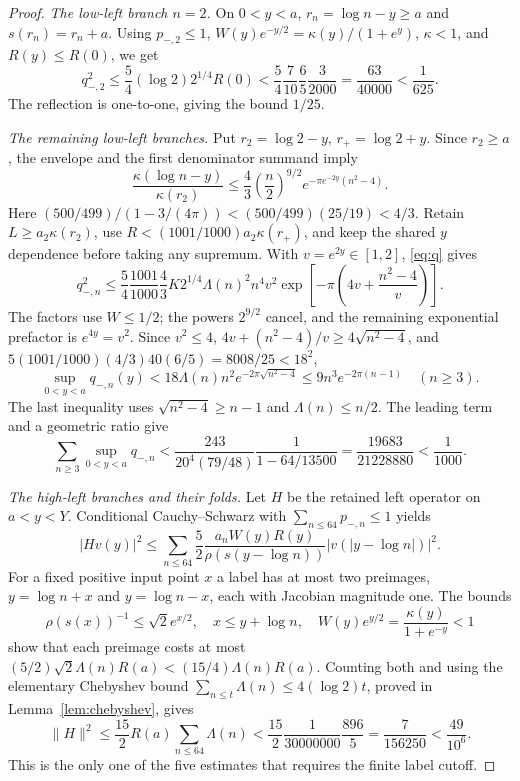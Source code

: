 \documentclass[11pt]{article}
\theoremstyle{remark}\newtheorem{remark}[theorem]{Remark}
\newcommand{\norm}[1]{\lVert #1\rVert}
\numberwithin{equation}{section}
\begin{document}
\begin{proof}
\medskip\noindent
\textit{The low-left branch $n=2$.}
On $0<y<a$, $r_n=\log n-y\ge a$ and $s(r_n)=r_n+a$.
Using $p_{-,2}\le1$, $W(y)e^{-y/2}=\kappa(y)/(1+e^y)$,
$\kappa<1$, and $R(y)\le R(0)$, we get
\[
 q_{-,2}^2\le\frac54(\log2)2^{1/4}R(0)
 <\frac54\frac7{10}\frac65\frac3{2000}
 =\frac{63}{40000}<\frac1{625}.
\]
The reflection is one-to-one, giving the bound $1/25$.

\medskip\noindent
\textit{The remaining low-left branches.}
Put $r_2=\log2-y$, $r_+=\log2+y$. Since $r_2\ge a$, the envelope and the first denominator summand imply
\begin{equation}\label{eq:leftsource}
 \frac{\kappa(\log n-y)}{\kappa(r_2)}
 \le\frac43\left(\frac n2\right)^{9/2}
             e^{-\pi e^{-2y}(n^2-4)}.
\end{equation}
Here $(500/499)/(1-3/(4\pi))<(500/499)(25/19)<4/3$.
Retain $L\ge a_2\kappa(r_2)$, use
$R<(1001/1000)a_2\kappa(r_+)$, and keep the shared $y$ dependence before taking any supremum. With $v=e^{2y}\in[1,2]$, \eqref{eq:q} gives
\begin{equation}\label{eq:coupled}
 q_{-,n}^2\le\frac54\frac{1001}{1000}\frac43K2^{1/4}
 \Lambda(n)^2n^4v^2
 \exp\left[-\pi\left(4v+\frac{n^2-4}{v}\right)\right].
\end{equation}
The factors use $W\le1/2$; the powers $2^{9/2}$ cancel, and the remaining exponential prefactor is $e^{4y}=v^2$.
Since $v^2\le4$, $4v+(n^2-4)/v\ge4\sqrt{n^2-4}$, and
$5(1001/1000)(4/3)40(6/5)=8008/25<18^2$,
\[
 \sup_{0<y<a}q_{-,n}(y)
 <18\Lambda(n)n^2e^{-2\pi\sqrt{n^2-4}}
 \le9n^3e^{-2\pi(n-1)}\quad(n\ge3).
\]
The last inequality uses $\sqrt{n^2-4}\ge n-1$ and $\Lambda(n)\le n/2$.
The leading term and a geometric ratio give
\begin{equation}\label{eq:leftrest}
 \sum_{n\ge3}\sup_{0<y<a}q_{-,n}
 <\frac{243}{20^4(79/48)}\frac1{1-64/13500}
 =\frac{19683}{21228880}<\frac1{1000}.
\end{equation}

\medskip\noindent
\textit{The high-left branches and their folds.}
Let $H$ be the retained left operator on $a<y<Y$.
Conditional Cauchy--Schwarz with $\sum_{n\le64}p_{-,n}\le1$ yields
\[
 |Hv(y)|^2\le\sum_{n\le64}\frac52
 \frac{a_nW(y)R(y)}{\rho(s(y-\log n))}
 |v(|y-\log n|)|^2.
\]
For a fixed positive input point $x$ a label has at most two preimages,
$y=\log n+x$ and $y=\log n-x$, each with Jacobian magnitude one.
The bounds
\[
 \rho(s(x))^{-1}\le\sqrt2e^{x/2},\quad x\le y+\log n,
 \quad W(y)e^{y/2}=\frac{\kappa(y)}{1+e^{-y}}<1
\]
show that each preimage costs at most
$(5/2)\sqrt2\Lambda(n)R(a)<(15/4)\Lambda(n)R(a)$.
Counting both and using the elementary Chebyshev bound
$\sum_{n\le t}\Lambda(n)\le4(\log2)t$, proved in
Lemma~\ref{lem:chebyshev}, gives
\[
 \norm H^2\le\frac{15}{2}R(a)\sum_{n\le64}\Lambda(n)
 <\frac{15}{2}\frac1{30000000}\frac{896}{5}
 =\frac7{156250}<\frac{49}{10^6}.
\]
This is the only one of the five estimates that requires the finite label cutoff.
\end{proof}
\end{document}
